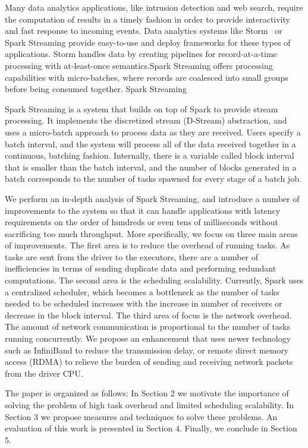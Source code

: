 \noindent

Many data analytics applications, like intrusion detection and web search, require the computation of results in a timely fashion in order to provide interactivity and fast response to incoming events.
Data analytics systems like Storm~\cite{Storm} or Spark Streaming provide easy-to-use and deploy frameworks for these types of applications. Storm handles data by creating pipelines for record-at-a-time processing with at-least-once semantics.Spark Streaming offers processing capabilities with micro-batches, where records are coalesced into small groups before being consumed together.
Spark Streaming 


Spark Streaming is a system that builds on top of Spark to provide stream processing. It implements the discretized stream (D-Stream) abstraction, and uses a micro-batch approach to process data as they are received. Users specify a batch interval, and the system will process all of the data received together in a continuous, batching fashion. Internally, there is a variable called block interval that is smaller than the batch interval, and the number of blocks generated in a batch corresponds to the number of tasks spawned for every stage of a  batch job.

We perform an in-depth analysis of Spark Streaming, and introduce a number of improvements to the system so that it can handle applications with latency requirements on the order of hundreds or even tens of milliseconds without sacrificing too much throughput. More specifically, we focus on three main areas of improvements. The first area is to reduce the overhead of running tasks. As tasks are sent from the driver to the executors, there are a number of inefficiencies in terms of sending duplicate data and performing redundant computations. The second area is the scheduling scalability. Currently, Spark uses a centralized scheduler, which becomes a bottleneck as the number of tasks needed to be scheduled increases with the increase in number of receivers or decrease in the block interval. The third area of focus is the network overhead. The amount of network communication is proportional to the number of tasks running concurrently. We propose an enhancement that uses newer technology such as InfiniBand to reduce the transmission delay, or remote direct memory access (RDMA) to relieve the burden of sending and receiving network packets from the driver CPU.

The paper is organized as follows: In Section 2 we motivate the importance of solving the problem of high task overhead and limited scheduling scalability. In Section 3 we propose measures and techniques to solve these problems. An evaluation of this work is presented in Section 4. Finally, we conclude in Section 5.

